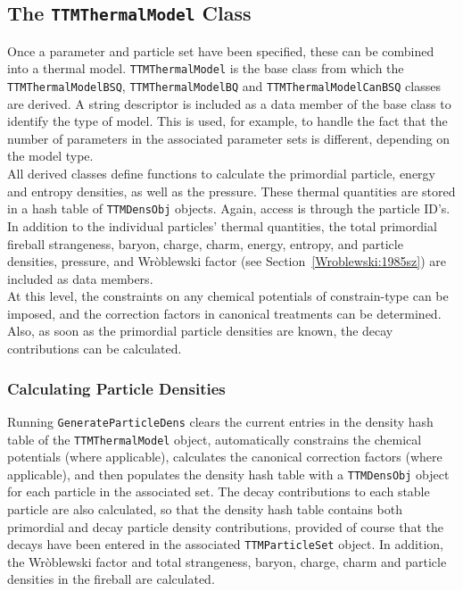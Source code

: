 \documentclass{elsarticle}
\begin{document}
\subsection{The \texttt{TTMThermalModel} Class}

Once a parameter and particle set have been specified, these can be 
combined into a thermal model. \texttt{TTMThermalModel} is the base class from which the 
\texttt{TTMThermalModelBSQ}, \texttt{TTMThermalModelBQ} and
\texttt{TTMThermalModelCanBSQ}\linebreak
classes are derived. A string descriptor is included as a data member of the base class 
to identify the type of model. This is used, for example, 
to handle the fact that the number of parameters in the associated parameter 
sets is different, depending on the model type.\\ 

All derived classes define functions 
to calculate the primordial particle, energy and entropy 
densities, as well as the pressure. These thermal quantities are stored in a hash table of \texttt{TTMDensObj} 
objects. Again, access is through the particle ID's. In addition to the individual particles' 
thermal quantities, the total primordial fireball strangeness, baryon, charge, charm, energy, entropy, 
and particle densities, pressure, and Wr\`oblewski factor (see Section~\ref{Wroblewski:1985sz}) are included as data members.\\ 

At this level, the constraints on any chemical potentials of constrain-type can be imposed, and the 
correction factors in canonical treatments can be determined. Also, as soon as the 
primordial particle densities are known, the decay contributions can be calculated.\\ 

\subsubsection{Calculating Particle Densities}

Running \texttt{GenerateParticleDens} clears the current entries in the density hash table of the 
\texttt{TTMThermalModel} object, automatically constrains the chemical potentials (where applicable), 
calculates the canonical correction factors (where applicable), and then populates the density 
hash table with a \texttt{TTMDensObj} object for each particle in the associated set. 
The decay contributions to 
each stable particle are also calculated, so that the density hash table contains both primordial and 
decay particle density contributions, provided of course that the decays have been entered in the associated 
\texttt{TTMParticleSet} object. In addition, the 
Wr\`oblewski factor and total strangeness, baryon, charge, charm and particle densities in the fireball 
are calculated.\\ 
\end{document}
